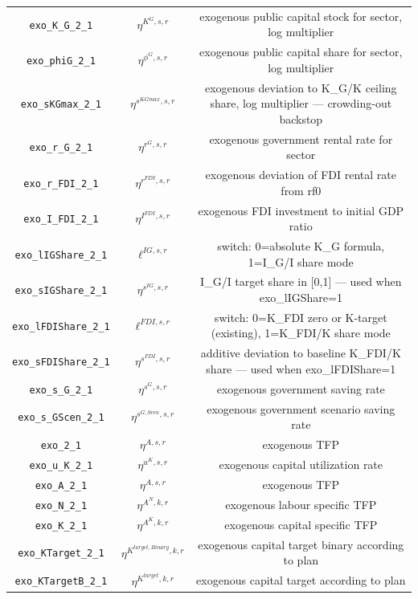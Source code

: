 \begin{center}
\begin{longtable}{ccc}
\texttt{exo\_K\_G\_2\_1} & ${\eta^{K^G,s,r}}$ & exogenous public capital stock for sector, log multiplier\\
\texttt{exo\_phiG\_2\_1} & ${\eta^{\phi^{G},s,r}}$ & exogenous public capital share for sector, log multiplier\\
\texttt{exo\_sKGmax\_2\_1} & ${\eta^{s^{KGmax},s,r}}$ & exogenous deviation to K\_G/K ceiling share, log multiplier — crowding-out backstop\\
\texttt{exo\_r\_G\_2\_1} & ${\eta^{r^G,s,r}}$ & exogenous government rental rate for sector\\
\texttt{exo\_r\_FDI\_2\_1} & ${\eta^{r^{FDI},s,r}}$ & exogenous deviation of FDI rental rate from rf0\\
\texttt{exo\_I\_FDI\_2\_1} & ${\eta^{I^{FDI},s,r}}$ & exogenous FDI investment to initial GDP ratio\\
\texttt{exo\_lIGShare\_2\_1} & ${\ell^{IG,s,r}}$ & switch: 0=absolute K\_G formula, 1=I\_G/I share mode\\
\texttt{exo\_sIGShare\_2\_1} & ${\eta^{s^{IG},s,r}}$ & I\_G/I target share in [0,1] — used when exo\_lIGShare=1\\
\texttt{exo\_lFDIShare\_2\_1} & ${\ell^{FDI,s,r}}$ & switch: 0=K\_FDI zero or K-target (existing), 1=K\_FDI/K share mode\\
\texttt{exo\_sFDIShare\_2\_1} & ${\eta^{s^{FDI},s,r}}$ & additive deviation to baseline K\_FDI/K share — used when exo\_lFDIShare=1\\
\texttt{exo\_s\_G\_2\_1} & ${\eta^{s^G,s,r}}$ & exogenous government saving rate\\
\texttt{exo\_s\_GScen\_2\_1} & ${\eta^{s^{G,Scen},s,r}}$ & exogenous government scenario saving rate\\
\texttt{exo\_2\_1} & ${\eta^{A,s,r}}$ & exogenous TFP\\
\texttt{exo\_u\_K\_2\_1} & ${\eta^{u^K,s,r}}$ & exogenous capital utilization rate\\
\texttt{exo\_A\_2\_1} & ${\eta^{A,s,r}}$ & exogenous TFP\\
\texttt{exo\_N\_2\_1} & ${\eta^{A^{N},k,r}}$ & exogenous labour specific TFP\\
\texttt{exo\_K\_2\_1} & ${\eta^{A^{K},k,r}}$ & exogenous capital specific TFP\\
\texttt{exo\_KTarget\_2\_1} & ${\eta^{K^{target,Binary},k,r}}$ & exogenous capital target binary according to plan\\
\texttt{exo\_KTargetB\_2\_1} & ${\eta^{K^{target},k,r}}$ & exogenous capital target according to plan\\

\end{longtable}
\end{center}
